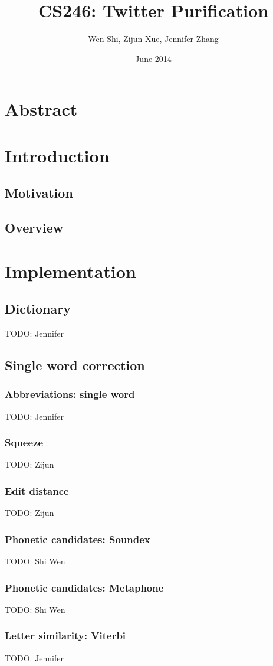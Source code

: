 \documentclass[10pt]{article}
\title{CS246: Twitter Purification}
\author{Wen Shi, Zijun Xue, Jennifer Zhang}
\date{June 2014}
\begin{document}
\maketitle

\section*{Abstract}
\section*{Introduction}
\subsection*{Motivation}
\subsection*{Overview}
\section*{Implementation}
\subsection*{Dictionary}
TODO: Jennifer
\subsection*{Single word correction}
\subsubsection*{Abbreviations: single word}
TODO: Jennifer
\subsubsection*{Squeeze}
TODO: Zijun
\subsubsection*{Edit distance}
TODO: Zijun
\subsubsection*{Phonetic candidates: Soundex}
TODO: Shi Wen
\subsubsection*{Phonetic candidates: Metaphone}
TODO: Shi Wen
\subsubsection*{Letter similarity: Viterbi}
TODO: Jennifer
\end{document}
